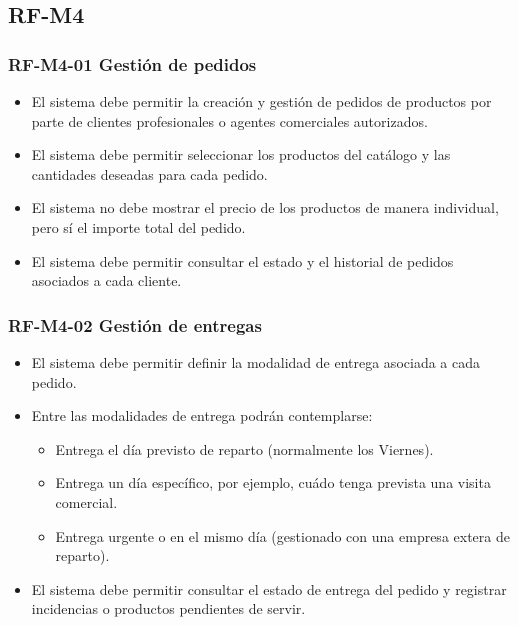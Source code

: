 \subsection{RF-M4}

\vspace{-0.75em}
\subsubsection{RF-M4-01 Gestión de pedidos}
\vspace{-1em}

\begin{itemize}
    \item El sistema debe permitir la creación y gestión de pedidos de productos por parte de clientes profesionales o agentes comerciales autorizados.
    \item El sistema debe permitir seleccionar los productos del catálogo y las cantidades deseadas para cada pedido.
    \item El sistema no debe mostrar el precio de los productos de manera individual, pero sí el importe total del pedido.
    \item El sistema debe permitir consultar el estado y el historial de pedidos asociados a cada cliente.
\end{itemize}

\vspace{-0.75em}
\subsubsection{RF-M4-02 Gestión de entregas}
\vspace{-1em}

\begin{itemize}
    \item El sistema debe permitir definir la modalidad de entrega asociada a cada pedido.
    \item Entre las modalidades de entrega podrán contemplarse:
          \begin{itemize}
              \item Entrega el día previsto de reparto (normalmente los Viernes).
              \item Entrega un día específico, por ejemplo, cuádo tenga prevista una visita comercial.
              \item Entrega urgente o en el mismo día (gestionado con una empresa extera de reparto).
          \end{itemize}
    \item El sistema debe permitir consultar el estado de entrega del pedido y registrar incidencias o productos pendientes de servir.
\end{itemize}

